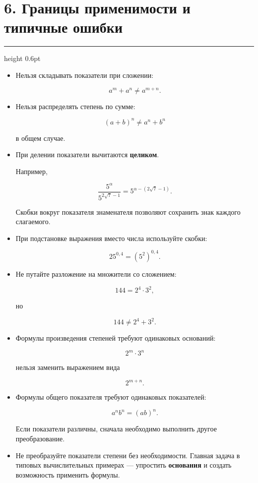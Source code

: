 \documentclass[a4paper,12pt]{article}
\newcommand{\sectionline}{
  \par
  \vspace{0.2em}
  {\color{accent}\hrule height 0.6pt}
  \vspace{0.8em}
}
\begin{document}
\clearpage
\pagestyle{fancy}


\section*{6. Границы применимости и типичные ошибки}
\sectionline

\begin{itemize}

  \item Нельзя складывать показатели при сложении:

  \[
  a^m+a^n\ne a^{m+n}.
  \]

  \item Нельзя распределять степень по сумме:

  \[
  (a+b)^n\ne a^n+b^n
  \]

  в общем случае.

  \item При делении показатели вычитаются \textbf{целиком}.

  Например,

  \[
  \frac{5^{\alpha}}
  {5^{2\sqrt7-1}}
  =
  5^{\alpha-(2\sqrt7-1)}.
  \]

  Скобки вокруг показателя знаменателя позволяют сохранить знак
  каждого слагаемого.

  \item При подстановке выражения вместо числа используйте скобки:

  \[
  25^{0{,}4}
  =
  (5^2)^{0{,}4}.
  \]

  \item Не путайте разложение на множители со сложением:

  \[
  144=2^4\cdot3^2,
  \]

  но

  \[
  144\ne2^4+3^2.
  \]

  \item Формулы произведения степеней требуют одинаковых оснований:

  \[
  2^m\cdot3^n
  \]

  нельзя заменить выражением вида

  \[
  2^{m+n}.
  \]

  \item Формулы общего показателя требуют одинаковых показателей:

  \[
  a^n b^n=(ab)^n.
  \]

  Если показатели различны, сначала необходимо выполнить другое
  преобразование.

  \item Не преобразуйте показатели степени без необходимости.
  Главная задача в типовых вычислительных примерах ---
  упростить \textbf{основания} и создать возможность применить формулы.

\end{itemize}
\end{document}

